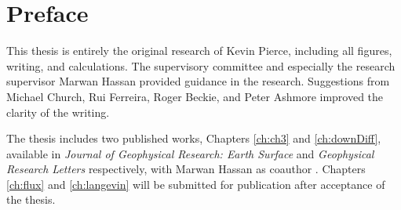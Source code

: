 
\chapter{Preface}

This thesis is entirely the original research of Kevin Pierce, including all figures, writing, and calculations.
The supervisory committee and especially the research supervisor Marwan Hassan provided guidance in the research.
Suggestions from Michael Church, Rui Ferreira, Roger Beckie, and Peter Ashmore improved the clarity of the writing.

The thesis includes two published works, Chapters \ref{ch:ch3} and \ref{ch:downDiff}, available in \textit{Journal of Geophysical Research: Earth Surface} and \textit{Geophysical Research Letters} respectively, with Marwan Hassan as coauthor \citep{Pierce2020a,Pierce2020b}. Chapters \ref{ch:flux} and \ref{ch:langevin} will be submitted for publication after acceptance of the thesis.
